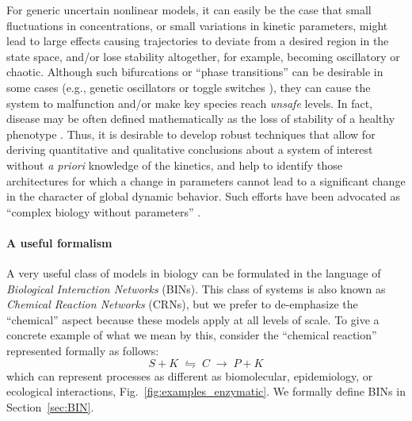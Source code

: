 \documentclass[onefignum,onetabnum]{siamonline220329}
\begin{document}
For generic uncertain nonlinear models, it can easily be the case that small fluctuations in concentrations, or small variations in kinetic parameters, might lead to large effects causing trajectories to deviate from a desired region in the state space, and/or lose stability altogether, for example, becoming oscillatory or chaotic.  Although such  bifurcations or ``phase transitions'' can be desirable in some cases (e.g., genetic oscillators \cite{elowitz00} or toggle switches \cite{collins00}), they can cause the system to malfunction and/or make key species reach \emph{unsafe} levels. In fact, disease may be often defined mathematically as the loss of stability of a healthy phenotype \cite{maclean15,langlois17}. Thus, it is desirable to develop
robust techniques that allow for deriving quantitative and qualitative conclusions about a system of interest without \textit{a priori} knowledge of the kinetics, and help to identify those architectures for which a change in parameters cannot lead to a significant change in the character of global dynamic behavior. Such efforts  have been advocated as ``complex  biology without parameters'' \cite{bailey01}.

\paragraph{A useful formalism}

A very useful class of models in biology can be formulated in the language of \textit{Biological Interaction Networks} (BINs). This class of systems is also known as \textit{Chemical Reaction Networks} (CRNs), but we prefer to de-emphasize the ``chemical'' aspect because these models apply at all levels of scale. To give a concrete example of what we mean by this, consider the ``chemical reaction'' represented formally as follows:
\[
S+K \;\leftrightharpoons\; C \; \to \; P + K
\]
which can represent processes as different as biomolecular, epidemiology, or ecological interactions, Fig.~\ref{fig:examples_enzymatic}.
We formally define BINs in Section~\ref{sec:BIN}.
\end{document}

